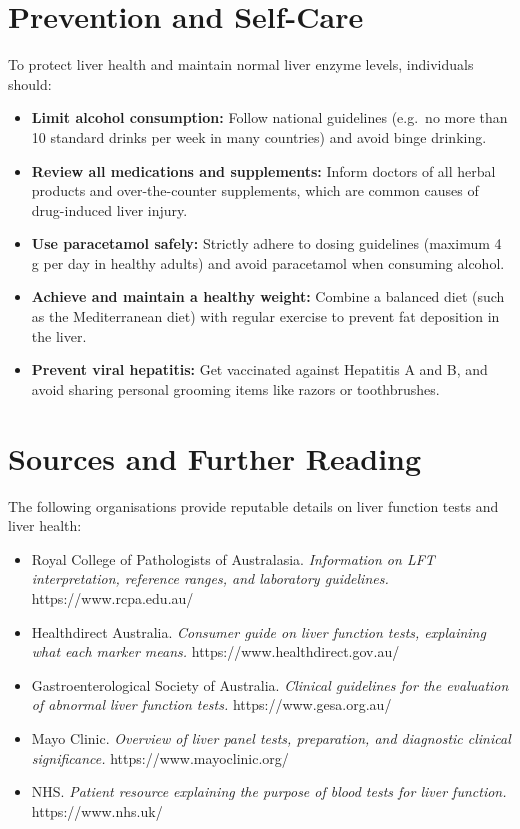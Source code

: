 \section*{Prevention and Self-Care}
To protect liver health and maintain normal liver enzyme levels, individuals should:

\begin{itemize}
    \item \textbf{Limit alcohol consumption:} Follow national guidelines (e.g.\ no more than 10 standard drinks per week in many countries) and avoid binge drinking.
    \item \textbf{Review all medications and supplements:} Inform doctors of all herbal products and over-the-counter supplements, which are common causes of drug-induced liver injury.
    \item \textbf{Use paracetamol safely:} Strictly adhere to dosing guidelines (maximum 4 g per day in healthy adults) and avoid paracetamol when consuming alcohol.
    \item \textbf{Achieve and maintain a healthy weight:} Combine a balanced diet (such as the Mediterranean diet) with regular exercise to prevent fat deposition in the liver.
    \item \textbf{Prevent viral hepatitis:} Get vaccinated against Hepatitis A and B, and avoid sharing personal grooming items like razors or toothbrushes.
\end{itemize}

\section*{Sources and Further Reading}
The following organisations provide reputable details on liver function tests and liver health:

\begin{itemize}
    \item Royal College of Pathologists of Australasia. \textit{Information on LFT interpretation, reference ranges, and laboratory guidelines.} https://www.rcpa.edu.au/
    \item Healthdirect Australia. \textit{Consumer guide on liver function tests, explaining what each marker means.} https://www.healthdirect.gov.au/
    \item Gastroenterological Society of Australia. \textit{Clinical guidelines for the evaluation of abnormal liver function tests.} https://www.gesa.org.au/
    \item Mayo Clinic. \textit{Overview of liver panel tests, preparation, and diagnostic clinical significance.} https://www.mayoclinic.org/
    \item NHS. \textit{Patient resource explaining the purpose of blood tests for liver function.} https://www.nhs.uk/
\end{itemize}
